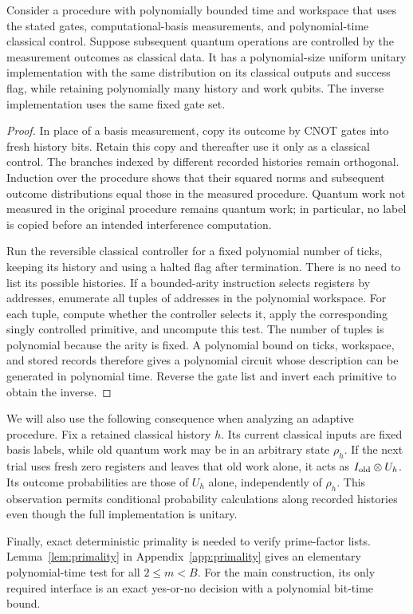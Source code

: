 \begin{lemma}\label{lem:records}
Consider a procedure with polynomially bounded time and workspace that uses the stated gates, computational-basis measurements, and polynomial-time classical control. Suppose subsequent quantum operations are controlled by the measurement outcomes as classical data. It has a polynomial-size uniform unitary implementation with the same distribution on its classical outputs and success flag, while retaining polynomially many history and work qubits. The inverse implementation uses the same fixed gate set.
\end{lemma}
\begin{proof}
In place of a basis measurement, copy its outcome by CNOT gates into fresh history bits. Retain this copy and thereafter use it only as a classical control. The branches indexed by different recorded histories remain orthogonal. Induction over the procedure shows that their squared norms and subsequent outcome distributions equal those in the measured procedure. Quantum work not measured in the original procedure remains quantum work; in particular, no label is copied before an intended interference computation.

Run the reversible classical controller for a fixed polynomial number of ticks, keeping its history and using a halted flag after termination. There is no need to list its possible histories. If a bounded-arity instruction selects registers by addresses, enumerate all tuples of addresses in the polynomial workspace. For each tuple, compute whether the controller selects it, apply the corresponding singly controlled primitive, and uncompute this test. The number of tuples is polynomial because the arity is fixed. A polynomial bound on ticks, workspace, and stored records therefore gives a polynomial circuit whose description can be generated in polynomial time. Reverse the gate list and invert each primitive to obtain the inverse.
\end{proof}

We will also use the following consequence when analyzing an adaptive procedure. Fix a retained classical history $h$. Its current classical inputs are fixed basis labels, while old quantum work may be in an arbitrary state $\rho_h$. If the next trial uses fresh zero registers and leaves that old work alone, it acts as $I_{\rm old}\otimes U_h$. Its outcome probabilities are those of $U_h$ alone, independently of $\rho_h$. This observation permits conditional probability calculations along recorded histories even though the full implementation is unitary.

Finally, exact deterministic primality is needed to verify prime-factor lists. Lemma~\ref{lem:primality} in Appendix~\ref{app:primality} gives an elementary polynomial-time test for all $2\le m<B$. For the main construction, its only required interface is an exact yes-or-no decision with a polynomial bit-time bound.
